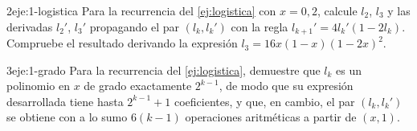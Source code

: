 \begin{ejercicio}{2}{eje:1-logistica}
Para la recurrencia del \cref{ej:logistica} con $x=0{,}2$, calcule $l_2$, $l_3$ y las derivadas $l_2'$, $l_3'$ propagando el par $(l_k,l_k')$ con la regla $l_{k+1}'=4l_k'(1-2l_k)$. Compruebe el resultado derivando la expresión $l_3=16x(1-x)(1-2x)^{2}$.
\end{ejercicio}

\begin{ejercicio}{3}{eje:1-grado}
Para la recurrencia del \cref{ej:logistica}, demuestre que $l_k$ es un polinomio en $x$ de grado exactamente $2^{k-1}$, de modo que su expresión desarrollada tiene hasta $2^{k-1}+1$ coeficientes, y que, en cambio, el par $(l_k,l_k')$ se obtiene con a lo sumo $6(k-1)$ operaciones aritméticas a partir de $(x,1)$.
\end{ejercicio}
